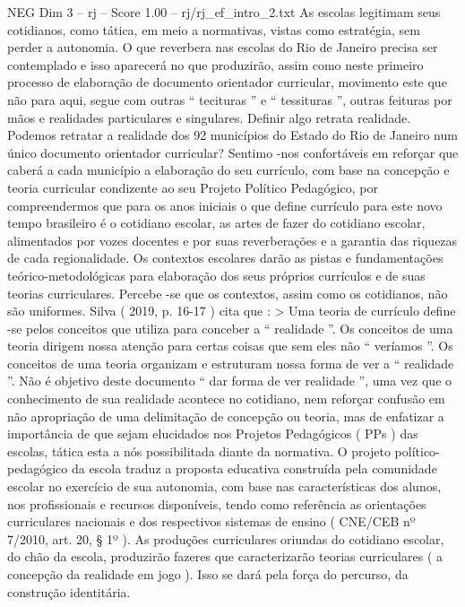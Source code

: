 \begin{textsample}{NEG Dim 3 – rj – Score 1.00 – rj/rj\_ef\_intro\_2.txt}  \label{ex:f3_neg_274}
As escolas legitimam seus cotidianos, como tática, em meio a normativas, vistas como estratégia, sem perder a autonomia.
O que reverbera nas escolas do Rio de Janeiro precisa ser contemplado e isso aparecerá no que produzirão, assim como neste primeiro processo de elaboração de documento orientador curricular, movimento este que não para aqui, segue com outras “ tecituras ” e “ tessituras ”, outras feituras por mãos e realidades particulares e singulares.
Definir algo retrata realidade.
Podemos retratar a realidade dos 92 municípios do Estado do Rio de Janeiro num único documento orientador curricular?
Sentimo -nos confortáveis em reforçar que caberá a cada município a elaboração do seu currículo, com base na concepção e teoria curricular condizente ao seu Projeto Político Pedagógico, por compreendermos que para os anos iniciais o que define currículo para este novo tempo brasileiro é o cotidiano escolar, as artes de fazer do cotidiano escolar, alimentados por vozes docentes e por suas reverberações e a garantia das riquezas de cada regionalidade.
Os contextos escolares darão as pistas e fundamentações teórico-metodológicas para elaboração dos seus próprios currículos e de suas teorias curriculares.
Percebe -se que os contextos, assim como os cotidianos, não são uniformes.
Silva ( 2019, p. 16-17 ) cita que : > Uma teoria de currículo define -se pelos conceitos que utiliza para conceber a “ realidade ”.
Os conceitos de uma teoria dirigem nossa atenção para certas coisas que sem eles não “ veríamos ”.
Os conceitos de uma teoria organizam e estruturam nossa forma de ver a “ realidade ”.
Não é objetivo deste documento “ dar forma de ver realidade ”, uma vez que o conhecimento de sua realidade acontece no cotidiano, nem reforçar confusão em não apropriação de uma delimitação de concepção ou teoria, mas de enfatizar a importância de que sejam elucidados nos Projetos Pedagógicos ( PPs ) das escolas, tática esta a nós possibilitada diante da normativa.
O projeto político-pedagógico da escola traduz a proposta educativa construída pela comunidade escolar no exercício de sua autonomia, com base nas características dos alunos, nos profissionais e recursos disponíveis, tendo como referência as orientações curriculares nacionais e dos respectivos sistemas de ensino ( CNE/CEB nº 7/2010, art. 20, § 1º ).
As produções curriculares oriundas do cotidiano escolar, do chão da escola, produzirão fazeres que caracterizarão teorias curriculares ( a concepção da realidade em jogo ).
Isso se dará pela força do percurso, da construção identitária.

\end{textsample}
